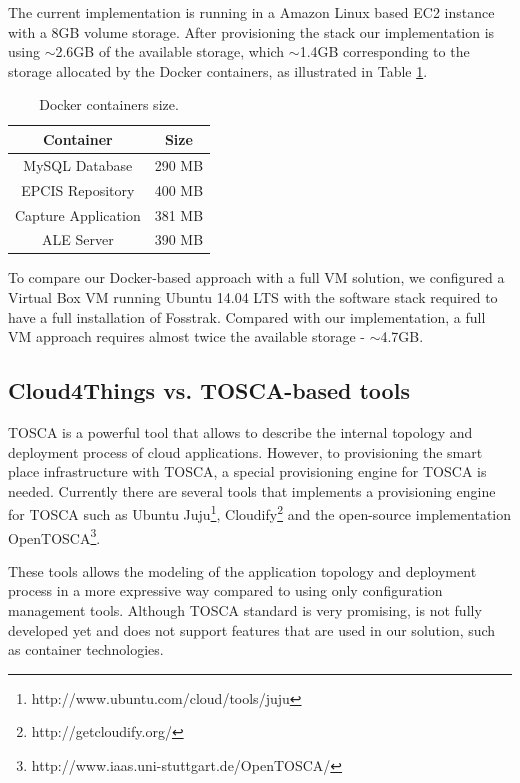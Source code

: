 The current implementation is running in a Amazon Linux based EC2 instance with a 8GB volume storage.
After provisioning the stack our implementation is using $\sim$2.6GB of the available storage, which $\sim$1.4GB
corresponding to the storage allocated by the Docker containers, as illustrated in Table \ref{table:containers_size}.

\begin{table}[!ht]
\centering
\begin{tabular}{|c|c|}
\hline
\multicolumn{1}{|c|}{Container} & \multicolumn{1}{c|}{Size} \\ \hline
MySQL Database                  & 290 MB                    \\ \hline
EPCIS Repository                & 400 MB                    \\ \hline
Capture Application             & 381 MB                    \\ \hline
ALE Server                      & 390 MB                    \\ \hline
\end{tabular}
\caption{Docker containers size.}
\label{table:containers_size}
\end{table}

To compare our Docker-based approach with a full VM solution, we configured a Virtual Box VM running
Ubuntu 14.04 LTS with the software stack required to have a full installation of Fosstrak. Compared
with our implementation, a full VM approach requires almost twice the available storage - $\sim$4.7GB.

\subsection{Cloud4Things vs. TOSCA-based tools}
\label{sub:c4t_vs_tosca}
TOSCA is a powerful tool that allows to describe the internal topology and deployment process of cloud applications.
However, to provisioning the smart place infrastructure with TOSCA, a special provisioning engine for TOSCA is needed.
Currently there are several tools that implements a provisioning engine for TOSCA such as Ubuntu Juju\footnote{http://www.ubuntu.com/cloud/tools/juju},
Cloudify\footnote{http://getcloudify.org/} and the open-source implementation OpenTOSCA\footnote{http://www.iaas.uni-stuttgart.de/OpenTOSCA/}.

These tools allows the modeling of the application topology and deployment process in a more expressive way compared
to using only configuration management tools. Although TOSCA standard is very promising, is not fully developed yet
and does not support features that are used in our solution, such as container technologies.
